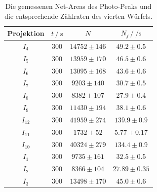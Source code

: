 \begin{table}[H]
  \centering
  \begin{tabular}{c c c c}
    \toprule
    Projektion &  $t \:/\: \si{\second}$ &     $N$ &           $N_j \:/\: \si{\per\second}$ \\
    \midrule
        $I_{  4}$ &   $300$ & $14752 \pm     146$ & $  49.2\pm0.5$ \\
        $I_{  5}$ &   $300$ & $13959 \pm     170$ & $  46.5\pm0.6$ \\
        $I_{  6}$ &   $300$ & $13095 \pm     168$ & $  43.6\pm0.6$ \\
        $I_{  7}$ &   $300$ & $ 9203 \pm     140$ & $  30.7\pm0.5$ \\
        $I_{  8}$ &   $300$ & $ 8382 \pm     107$ & $  27.9\pm0.4$ \\
        $I_{  9}$ &   $300$ & $11430 \pm     194$ & $  38.1\pm0.6$ \\
        $I_{ 12}$ &   $300$ & $41959 \pm     274$ & $ 139.9\pm0.9$ \\
        $I_{ 11}$ &   $300$ & $ 1732 \pm      52$ & $  5.77\pm0.17$ \\
        $I_{ 10}$ &   $300$ & $40324 \pm     279$ & $ 134.4\pm0.9$ \\
        $I_{  1}$ &   $300$ & $ 9735 \pm     161$ & $  32.5\pm0.5$ \\
        $I_{  2}$ &   $300$ & $ 8366 \pm     104$ & $ 27.89\pm0.35$ \\
        $I_{  3}$ &   $300$ & $13498 \pm     170$ & $  45.0\pm0.6$ \\
      \bottomrule
  \end{tabular}
  \caption{Die gemessenen Net-Areas des Photo-Peaks und die entsprechende Zählraten des vierten Würfels. }
  \label{tab:w4}
\end{table}